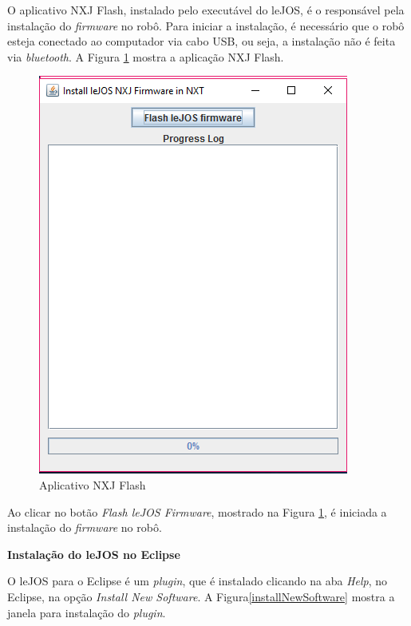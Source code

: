 	O aplicativo NXJ Flash, instalado pelo executável do leJOS, é o responsável pela instalação do \textit{firmware} no robô. Para iniciar a instalação, é necessário que o robô esteja conectado ao computador via cabo USB, ou seja, a instalação não é feita via \textit{bluetooth}.  
	A Figura \ref{lejosFirmware} mostra a aplicação NXJ Flash.
\FloatBarrier
\begin{figure}[!h]
\centering
\includegraphics[keepaspectratio=true,scale=0.7]{figuras/lejosFirmware.png}
\caption{Aplicativo NXJ Flash}
\label{lejosFirmware}
\end{figure}
	Ao clicar no botão \textit{Flash leJOS Firmware}, mostrado na Figura \ref{lejosFirmware}, é iniciada a instalação do \textit{firmware} no robô.
	
	\textbf{Instalação do leJOS no Eclipse}
	
	O leJOS para o Eclipse é um \textit{plugin}, que é instalado clicando na aba \textit{Help}, no Eclipse, na opção \textit{Install New Software}. A Figura\ref{installNewSoftware} mostra a janela para instalação do \textit{plugin}. 

